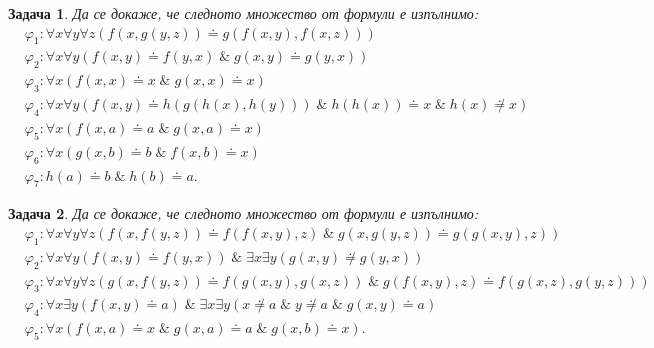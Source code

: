 \documentclass[12pt]{article}
\newtheorem{problem}{Задача}[section]
\theoremstyle{definition}
\theoremstyle{remark}
\begin{document}
\begin{problem}
Да се докаже, че следното множество от формули е изпълнимо:
\begin{align*}
       & \varphi_1 : \forall x \forall y \forall z (f(x, g(y, z)) \doteq g(f(x, y), f(x, z)))                                    \\
       & \varphi_2 : \forall x \forall y (f(x, y) \doteq f(y, x) \; \& \; g(x, y) \doteq g(y, x))                                \\
       & \varphi_3 : \forall x  (f(x, x) \doteq x \; \& \; g(x, x) \doteq x)                                                     \\
       & \varphi_4 : \forall x \forall y (f(x, y) \doteq h(g(h(x), h(y))) \; \& \; h(h(x)) \doteq x \; \& \; h(x) \not \doteq x) \\
       & \varphi_5 : \forall x (f(x, a) \doteq a \; \& \; g(x, a) \doteq x)                                                      \\
       & \varphi_6 : \forall x (g(x, b) \doteq b \; \& \; f(x, b) \doteq x)                                                      \\
       & \varphi_7 : h(a) \doteq b \; \& \; h(b) \doteq a.
\end{align*}
\end{problem}

\begin{problem}
Да се докаже, че следното множество от формули е изпълнимо:
\begin{align*}
       & \varphi_1 : \forall x \forall y \forall z (f(x, f(y, z)) \doteq f(f(x, y), z) \; \& \; g(x, g(y, z)) \doteq g(g(x, y), z))                           \\
       & \varphi_2 : \forall x \forall y (f(x, y) \doteq f(y, x)) \; \& \; \exists x \exists y (g(x, y) \not \doteq g(y, x))                                  \\
       & \varphi_3 : \forall x \forall y \forall z (g(x, f(y, z)) \doteq f(g(x, y), g(x, z)) \; \& \; g(f(x, y), z) \doteq f(g(x, z), g(y, z)))               \\
       & \varphi_4 : \forall x \exists y (f(x, y) \doteq a) \; \& \; \exists x \exists y (x \not \doteq a \; \& \; y \not \doteq a \; \& \; g(x, y) \doteq a) \\
       & \varphi_5 : \forall x (f(x, a) \doteq x \; \& \; g(x, a) \doteq a \; \& \; g(x, b) \doteq x).
\end{align*}
\end{problem}
\end{document}
